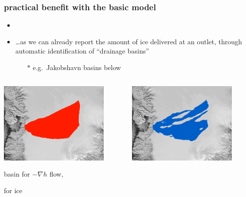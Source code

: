 \documentclass[hide notes,intlimits]{beamer}
\begin{document}
\begin{frame}
  \frametitle{practical benefit with the basic model}
 
\begin{itemize}
\item  {}
\item \dots as we can already report the amount of ice delivered at an outlet, through automatic identification of ``drainage basins''
  \begin{itemize}
  \item[$\ast$] e.g.~Jakobshavn basins below
  \end{itemize}
\end{itemize}

\vspace{-5mm}

\begin{columns}
\begin{column}{0.5\textwidth}
\begin{center}
\includegraphics[width=0.85\textwidth]{figs/ftt-mask}

basin for $-\nabla h$ flow,

\phantom{where $\phi$}

for ice
\end{center}
\end{column}
\begin{column}{0.5\textwidth}
\begin{center}
\vspace{0.5mm}

\includegraphics[width=0.85\textwidth]{figs/hydro-mask}


\end{center}
\end{column}
\end{columns}
\end{frame}
\end{document}
